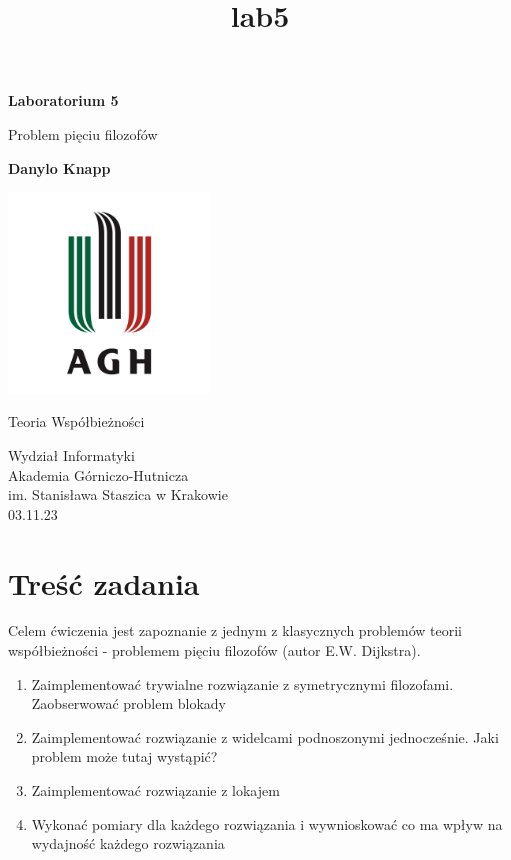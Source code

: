 \documentclass[11pt]{article}
\title{lab5}
\providecommand{\tightlist}{%
      \setlength{\itemsep}{0pt}\setlength{\parskip}{0pt}}
\begin{document}
    
\begin{titlepage}
    \begin{center}
        \vspace*{1cm}
 
        \textbf{Laboratorium 5}
 
        \vspace{0.5cm}
        Problem pięciu filozofów
             
        \vspace{1.5cm}
 
        \textbf{Danylo Knapp}

        \vfill

        \includegraphics[width=0.4\textwidth]{../report-templates/agh-logo.png}
 
        \vfill
             
        Teoria Współbieżności
             
        \vspace{0.8cm}

        Wydział Informatyki\\
        Akademia Górniczo-Hutnicza\\
        im. Stanisława Staszica w Krakowie\\
        03.11.23
             
    \end{center}
\end{titlepage}
    
    

    
    \hypertarget{treux15bux107-zadania}{%
\section{Treść zadania}\label{treux15bux107-zadania}}

Celem ćwiczenia jest zapoznanie z jednym z klasycznych problemów teorii
współbieżności - problemem pięciu filozofów (autor E.W. Dijkstra).

\begin{enumerate}
\def\labelenumi{\arabic{enumi}.}
\tightlist
\item
  Zaimplementować trywialne rozwiązanie z symetrycznymi filozofami.
  Zaobserwować problem blokady
\item
  Zaimplementować rozwiązanie z widelcami podnoszonymi jednocześnie.
  Jaki problem może tutaj wystąpić?
\item
  Zaimplementować rozwiązanie z lokajem
\item
  Wykonać pomiary dla każdego rozwiązania i wywnioskować co ma wpływ na
  wydajność każdego rozwiązania
\end{enumerate}
\end{document}
